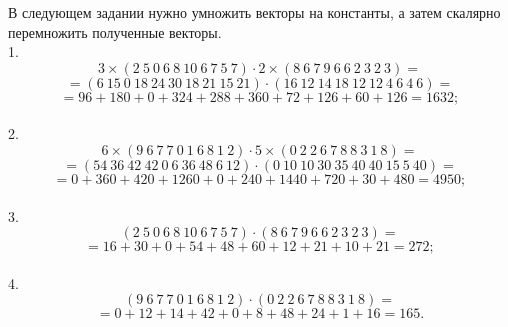 \documentclass[14pt,a4paper]{extarticle}
\begin{document}
В следующем задании нужно умножить векторы на константы, а затем скалярно перемножить полученные векторы.\\
1. \[3 \times(2 \ 5 \ 0 \ 6 \ 8 \ 10 \ 6 \ 7 \ 5 \ 7) \cdot 2 \times (8 \ 6 \ 7 \ 9 \ 6 \ 6 \ 2 \ 3 \ 2 \ 3) =\]
\[= (6 \ 15 \ 0 \ 18 \ 24 \ 30 \ 18 \ 21 \ 15 \ 21) \cdot (16 \ 12 \ 14 \ 18 \ 12 \ 12 \ 4 \ 6 \ 4 \ 6) =\]
\[= 96 + 180 + 0 + 324 + 288 + 360 + 72 + 126 + 60 + 126 = 1632;\]\\
2. 
\[6 \times (9 \ 6 \ 7 \ 7 \ 0 \ 1 \ 6 \ 8 \ 1 \ 2) \cdot 5 \times (0 \ 2 \ 2 \ 6 \ 7 \ 8 \ 8 \ 3 \ 1 \ 8) =\]
\[= (54 \ 36 \ 42 \ 42 \ 0 \ 6 \ 36 \ 48 \ 6 \ 12) \cdot (0 \ 10 \ 10 \ 30 \ 35 \ 40 \ 40 \ 15 \ 5 \ 40) =\]
\[= 0 + 360 + 420 + 1260 + 0 + 240 + 1440 + 720 + 30 + 480 = 4950;\]\\
3. 
\[(2 \ 5 \ 0 \ 6 \ 8 \ 10 \ 6 \ 7 \ 5 \ 7) \cdot (8 \ 6 \ 7 \ 9 \ 6 \ 6 \ 2 \ 3 \ 2 \ 3) =\]
\[= 16 + 30 + 0 + 54 + 48 + 60 + 12 + 21 + 10 + 21 = 272;\]\\
4. 
\[(9 \ 6 \ 7 \ 7 \ 0 \ 1 \ 6 \ 8 \ 1 \ 2) \cdot (0 \ 2 \ 2 \ 6 \ 7 \ 8 \ 8 \ 3 \ 1 \ 8) =\]
\[= 0 + 12 + 14 + 42 + 0 + 8 + 48 + 24 + 1 + 16 = 165.\]
\end{document}
